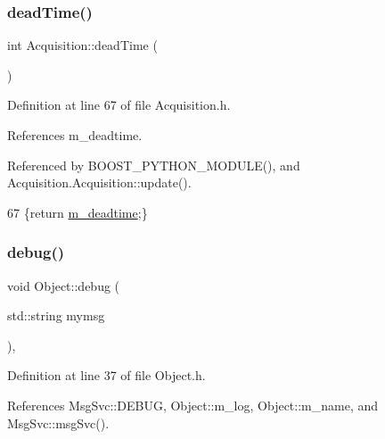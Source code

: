 \subsubsection{\texorpdfstring{dead\+Time()}{deadTime()}\hspace{0.1cm}{\footnotesize\ttfamily [2/2]}}
{\footnotesize\ttfamily int Acquisition\+::dead\+Time (\begin{DoxyParamCaption}{ }\end{DoxyParamCaption})\hspace{0.3cm}{\ttfamily [inline]}}



Definition at line 67 of file Acquisition.\+h.



References m\+\_\+deadtime.



Referenced by B\+O\+O\+S\+T\+\_\+\+P\+Y\+T\+H\+O\+N\+\_\+\+M\+O\+D\+U\+L\+E(), and Acquisition.\+Acquisition\+::update().


\begin{DoxyCode}
67 \{\textcolor{keywordflow}{return} \hyperlink{classAcquisition_a5f7fe20506e7d860ed61935255adfe17}{m\_deadtime};\}
\end{DoxyCode}
\mbox{\label{classObject_aac010553f022165573714b7014a15f0d}} 
\subsubsection{\texorpdfstring{debug()}{debug()}\hspace{0.1cm}{\footnotesize\ttfamily [1/2]}}
{\footnotesize\ttfamily void Object\+::debug (\begin{DoxyParamCaption}\item[{std\+::string}]{mymsg }\end{DoxyParamCaption})\hspace{0.3cm}{\ttfamily [inline]}, {\ttfamily [inherited]}}



Definition at line 37 of file Object.\+h.



References Msg\+Svc\+::\+D\+E\+B\+UG, Object\+::m\+\_\+log, Object\+::m\+\_\+name, and Msg\+Svc\+::msg\+Svc().



